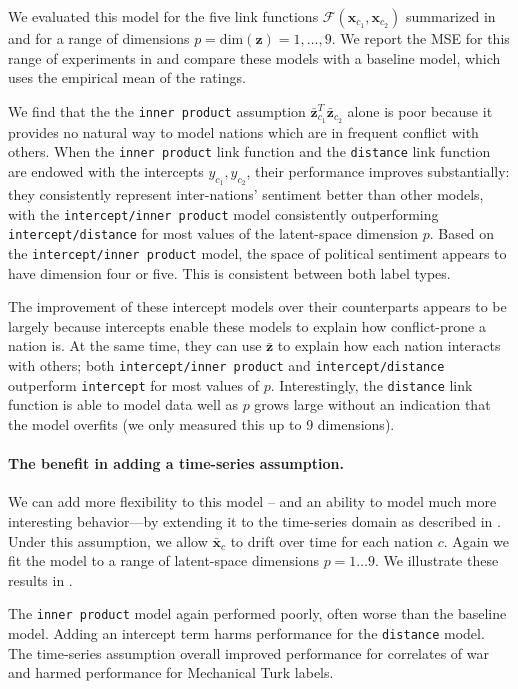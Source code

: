We evaluated this model for the five link functions $\mathcal{F}(\bm
x_{c_1}, \bm x_{c_2})$ summarized in  and for
a range of dimensions $p = \mbox{dim}(\bm z) = 1, \ldots, 9$.  We
report the MSE for this range of experiments in
 and compare these models with a
baseline model, which uses the empirical mean of the ratings.

We find that the the
\verb!inner product!  assumption $\bm \bar z_{c_1}^T \bm \bar z_{c_2}$
alone is poor because it provides no natural way to model
nations which are in frequent conflict with others.  When the
\verb!inner product! link function and the \verb!distance! link
function are endowed with the intercepts $y_{c_1}, y_{c_2}$, their
performance improves substantially: they consistently represent
inter-nations' sentiment better than other models, with the
\verb!intercept/inner product!  model consistently outperforming
\verb!intercept/distance! for most values of the latent-space
dimension $p$. Based on the \verb!intercept/inner product! model, the
space of political sentiment appears to have dimension four or five.
This is consistent between both label types.

The improvement of these intercept models over their counterparts
appears to be largely because intercepts enable these models to
explain how conflict-prone a nation is. At the same time, they can use
$\bm \bar z$ to explain how each nation interacts with others; both
\verb!intercept/inner product!  and \verb!intercept/distance!
outperform \verb!intercept! for most values of $p$.  Interestingly,
the \verb!distance! link function is able to model data well as $p$
grows large without an indication that the model overfits (we only
measured this up to 9 dimensions).


\paragraph{The benefit in adding a time-series assumption.}
We can add more flexibility to this model -- and an ability to model
much more interesting behavior---by extending it to the time-series
domain as described in .  Under this
assumption, we allow $\bm \bar x_c$ to drift over time for each
nation $c$.  Again we fit the model to a range of latent-space
dimensions $p = 1 \ldots 9$. We illustrate these results in
.

The \verb!inner product! model again performed poorly, often worse than the
baseline model.  Adding an intercept term harms performance for the
\verb!distance! model.  The time-series assumption overall improved
performance for correlates of war and harmed performance for
Mechanical Turk labels.

